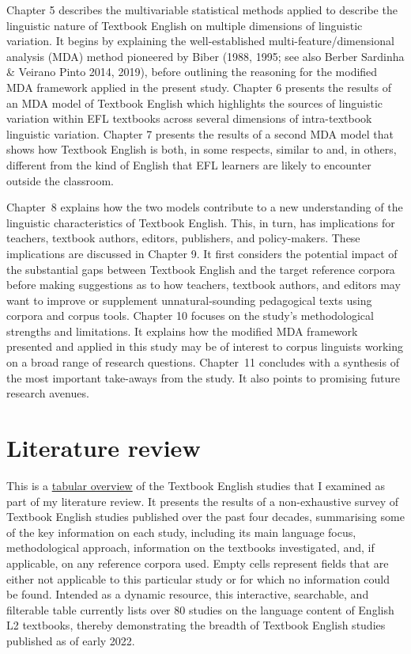 \documentclass[
  letterpaper,
  DIV=11,
  numbers=noendperiod]{scrreprt}
\begin{document}
Chapter 5 describes the multivariable statistical methods applied to
describe the linguistic nature of Textbook English on multiple
dimensions of linguistic variation. It begins by explaining the
well-established multi-feature/dimensional analysis (MDA) method
pioneered by Biber (1988, 1995; see also Berber Sardinha \& Veirano
Pinto 2014, 2019), before outlining the reasoning for the modified MDA
framework applied in the present study. Chapter 6 presents the results
of an MDA model of Textbook English which highlights the sources of
linguistic variation within EFL textbooks across several dimensions of
intra-textbook linguistic variation. Chapter 7 presents the results of a
second MDA model that shows how Textbook English is both, in some
respects, similar to and, in others, different from the kind of English
that EFL learners are likely to encounter outside the classroom.

Chapter~8 explains how the two models contribute to a new understanding
of the linguistic characteristics of Textbook English. This, in turn,
has implications for teachers, textbook authors, editors, publishers,
and policy-makers. These implications are discussed in Chapter 9. It
first considers the potential impact of the substantial gaps between
Textbook English and the target reference corpora before making
suggestions as to how teachers, textbook authors, and editors may want
to improve or supplement unnatural‑sounding pedagogical texts using
corpora and corpus tools. Chapter 10 focuses on the study's
methodological strengths and limitations. It explains how the modified
MDA framework presented and applied in this study may be of interest to
corpus linguists working on a broad range of research questions.
Chapter~11 concludes with a synthesis of the most important take-aways
from the study. It also points to promising future research avenues.


\chapter{Literature review}\label{literature-review}

This is a
\href{https://elenlefoll.github.io/TextbookEnglish/LitReviewTable.html}{tabular
overview} of the Textbook English studies that I examined as part of my
literature review. It presents the results of a non-exhaustive survey of
Textbook English studies published over the past four decades,
summarising some of the key information on each study, including its
main language focus, methodological approach, information on the
textbooks investigated, and, if applicable, on any reference corpora
used. Empty cells represent fields that are either not applicable to
this particular study or for which no information could be found.
Intended as a dynamic resource, this interactive, searchable, and
filterable table currently lists over 80 studies on the language content
of English L2 textbooks, thereby demonstrating the breadth of Textbook
English studies published as of early 2022.
\end{document}
